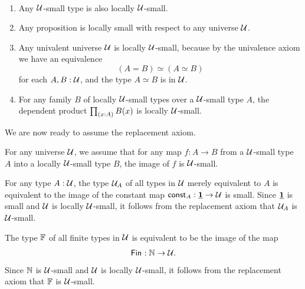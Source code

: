 \begin{eg}
  ~
  \begin{enumerate}
  \item Any $\mathcal{U}$-small type is also locally $\mathcal{U}$-small.
  \item Any proposition is locally small with respect to any universe $\mathcal{U}$.
  \item Any univalent universe $\mathcal{U}$ is locally $\mathcal{U}$-small, because by the univalence axiom we have an equivalence
    \begin{equation*}
      (A=B)\simeq (A\simeq B)
    \end{equation*}
    for each $A,B:\mathcal{U}$, and the type $A\simeq B$ is in $\mathcal{U}$.
  \item For any family $B$ of locally $\mathcal{U}$-small types over a $\mathcal{U}$-small type $A$, the dependent product $\prd{x:A}B(x)$ is locally $\mathcal{U}$-small.
  \end{enumerate}
\end{eg}

We are now ready to assume the replacement axiom.

\begin{axiom}\label{axiom:replacement}
  For any universe $\mathcal{U}$, we assume that for any map $f:A\to B$ from a $\mathcal{U}$-small type $A$ into a locally $\mathcal{U}$-small type $B$, the image of $f$ is $\mathcal{U}$-small.
\end{axiom}

\begin{eg}
  For any type $A:\mathcal{U}$, the type $\mathcal{U}_A$ of all types in $\mathcal{U}$ merely equivalent to $A$ is equivalent to the image of the constant map $\mathsf{const}_A:\underline{\mathbf{1}}\to \mathcal{U}$ is small. Since $\underline{\mathbf{1}}$ is small and $\mathcal{U}$ is locally $\mathcal{U}$-small, it follows from the replacement axiom that $\mathcal{U}_A$ is $\mathcal{U}$-small.
\end{eg}

\begin{eg}
  The type $\mathbb{F}$ of all finite types in $\mathcal{U}$ is equivalent to be the image of the map
  \begin{equation*}
    \mathsf{Fin}_{} : {\mathbb{N}}\to\mathcal{U}.
  \end{equation*}
  Since ${\mathbb{N}}$ is $\mathcal{U}$-small and $\mathcal{U}$ is locally $\mathcal{U}$-small, it follows from the replacement axiom that $\mathbb{F}$ is $\mathcal{U}$-small.
\end{eg}

